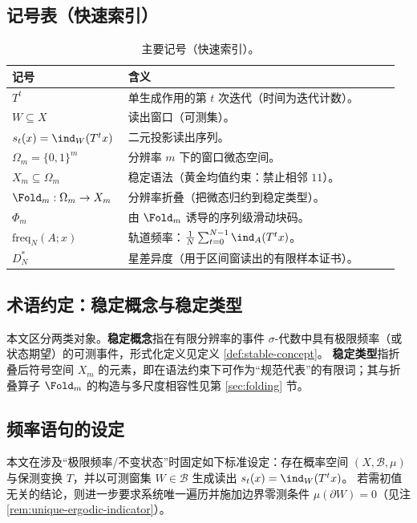 \subsection{记号表（快速索引）}
\begin{table}[t]
\centering
\begin{tabular}{>{\raggedright\arraybackslash}p{0.28\linewidth} >{\raggedright\arraybackslash}p{0.68\linewidth}}
\toprule
\textbf{记号} & \textbf{含义}\\
\midrule
\(T^t\) & 单生成作用的第 \(t\) 次迭代（时间为迭代计数）。\\
\(W\subseteq X\) & 读出窗口（可测集）。\\
\(s_t(x)=\ind_W(T^t x)\) & 二元投影读出序列。\\
\(\Omega_m=\{0,1\}^m\) & 分辨率 \(m\) 下的窗口微态空间。\\
\(X_m\subseteq\Omega_m\) & 稳定语法（黄金均值约束：禁止相邻 \(11\)）。\\
\(\Fold_m:\Omega_m\to X_m\) & 分辨率折叠（把微态归约到稳定类型）。\\
\(\Phi_m\) & 由 \(\Fold_m\) 诱导的序列级滑动块码。\\
\(\mathrm{freq}_N(A;x)\) & 轨道频率：\(\frac1N\sum_{t=0}^{N-1}\ind_A(T^t x)\)。\\
\(D_N^{\ast}\) & 星差异度（用于区间窗读出的有限样本证书）。\\
\bottomrule
\end{tabular}
\caption{主要记号（快速索引）。}
\label{tab:notation-index}
\end{table}

\subsection{术语约定：稳定概念与稳定类型}
本文区分两类对象。\textbf{稳定概念}指在有限分辨率的事件 \(\sigma\)-代数中具有极限频率（或状态期望）的可测事件，形式化定义见定义 \ref{def:stable-concept}。
\textbf{稳定类型}指折叠后符号空间 \(X_m\) 的元素，即在语法约束下可作为“规范代表”的有限词；其与折叠算子 \(\Fold_m\) 的构造与多尺度相容性见第 \ref{sec:folding} 节。

\subsection{频率语句的设定}\label{subsec:freq-setting}
本文在涉及“极限频率/不变状态”时固定如下标准设定：存在概率空间 \((X,\mathcal{B},\mu)\) 与保测变换 \(T\)，并以可测窗集 \(W\in\mathcal{B}\) 生成读出 \(s_t(x)=\ind_W(T^t x)\)。
若需初值无关的结论，则进一步要求系统唯一遍历并施加边界零测条件 \(\mu(\partial W)=0\)（见注 \ref{rem:unique-ergodic-indicator}）。

